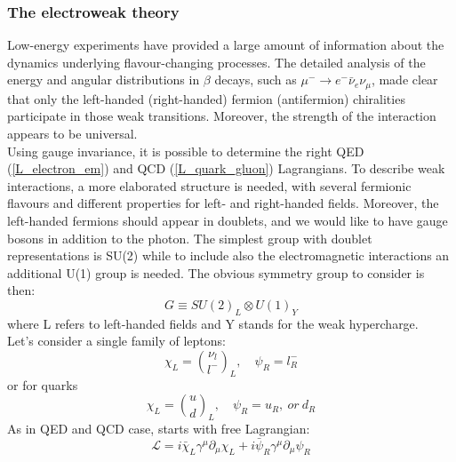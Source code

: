 \subsubsection{The electroweak theory}
Low-energy experiments have provided a large amount of information about the dynamics underlying flavour-changing processes. The detailed analysis of the energy and angular distributions in $\beta$ decays, such as $\mu^{-} \to e^{-}\bar{\nu}_{e}\nu_{\mu}$, made clear that only the left-handed (right-handed) fermion (antifermion) chiralities participate in those weak transitions. Moreover, the strength of the interaction appears to be universal. \\
Using gauge invariance, it is possible to determine the right QED (\ref{L_electron_em}) and QCD (\ref{L_quark_gluon}) Lagrangians. To describe weak interactions, a more elaborated structure is needed, with several fermionic flavours and different properties for left- and right-handed fields. Moreover, the left-handed fermions should appear in doublets, and we would like to have gauge bosons in addition to the photon. The simplest group with doublet representations is SU(2) while to include also the electromagnetic interactions an additional U(1) group is needed. The obvious symmetry group to consider is then:
\begin{equation}
G \equiv SU(2)_{L} \otimes U(1)_{Y}
\label{EWK_group}
\end{equation}
where L refers to left-handed fields and Y stands for the weak hypercharge. \\
Let's consider a single family of leptons:
\begin{equation}
\chi_{L} =  {\nu_{l} \choose l^{-}}_{L}, \quad \psi_{R} = l^{-}_{R}
\label{EWK_Singlet_doublet_Leptons}
\end{equation}
or for quarks
\begin{equation}
\chi_{L} =  {u \choose d}_{L} , \quad \psi_{R} = u_{R},\ or\ d_{R}
\label{EWK_Singlet_doublet_Leptons}
\end{equation}
As in QED and QCD case, starts with free Lagrangian:
\begin{equation}
\mathcal{L} = i\bar{\chi}_{L}\gamma^{\mu}\partial_{\mu}\chi_{L} + i\bar{\psi}_{R}\gamma^{\mu}\partial_{\mu}\psi_{R}
\label{L0_EWK}
\end{equation}
